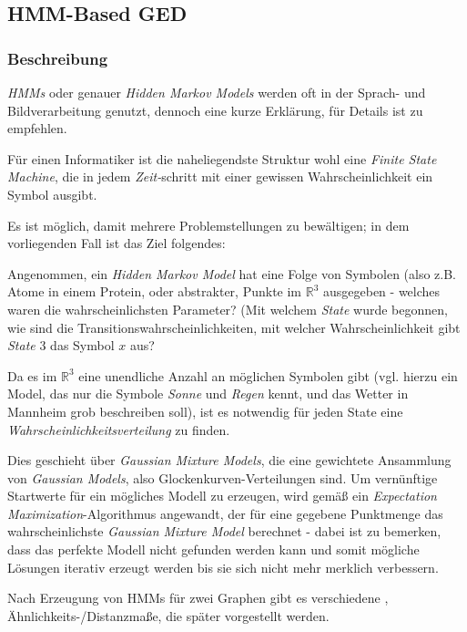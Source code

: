 \documentclass{DEarticle}
\begin{document}
\subsection{HMM-Based GED}
\subsubsection{Beschreibung}
\cite[HMM-Based GED]{comp}
\emph{HMMs} oder genauer \emph{Hidden Markov Models} werden oft in der Sprach- und Bildverarbeitung genutzt, dennoch
eine kurze Erklärung, für Details ist \cite{rabin} zu empfehlen.

Für einen Informatiker ist die naheliegendste Struktur wohl eine \emph{Finite State Machine}, die in jedem
\emph{Zeit-}schritt mit einer gewissen Wahrscheinlichkeit ein Symbol ausgibt. 

Es ist möglich, damit mehrere Problemstellungen zu bewältigen; in dem vorliegenden Fall ist das Ziel folgendes: 

Angenommen, ein \emph{Hidden Markov Model} hat eine Folge von Symbolen (also z.B. Atome in einem Protein, oder
abstrakter, Punkte im $\mathbb{R}^3$ ausgegeben - welches waren die wahrscheinlichsten Parameter? (Mit welchem
\emph{State} wurde begonnen, wie sind die Transitionswahrscheinlichkeiten, mit welcher Wahrscheinlichkeit gibt
\emph{State} $3$ das Symbol $x$ aus?

Da es im $\mathbb{R}^3$ eine unendliche Anzahl an möglichen Symbolen gibt (vgl. hierzu ein Model, das nur die
Symbole \emph{Sonne} und \emph{Regen} kennt, und das Wetter in Mannheim grob beschreiben soll), ist es notwendig für
jeden State eine \emph{Wahrscheinlichkeitsverteilung} zu finden.

Dies geschieht über \emph{Gaussian Mixture Models}, die eine gewichtete Ansammlung von \emph{Gaussian
Models}, also Glockenkurven-Verteilungen sind.
Um vernünftige Startwerte für ein mögliches Modell zu erzeugen, wird gemäß \cite{comp} ein \cite{emgmm}
\emph{Expectation Maximization}-Algorithmus angewandt, der für eine gegebene Punktmenge das wahrscheinlichste
\emph{Gaussian Mixture Model} berechnet - dabei ist zu bemerken, dass das perfekte Modell nicht gefunden werden kann und
somit mögliche Lösungen iterativ erzeugt werden bis sie sich nicht mehr merklich verbessern.


Nach Erzeugung von HMMs für zwei Graphen gibt es verschiedene \cite{randomwalk}, \cite{comp} Ähnlichkeits-/Distanzmaße,
die später vorgestellt werden.
\end{document}
